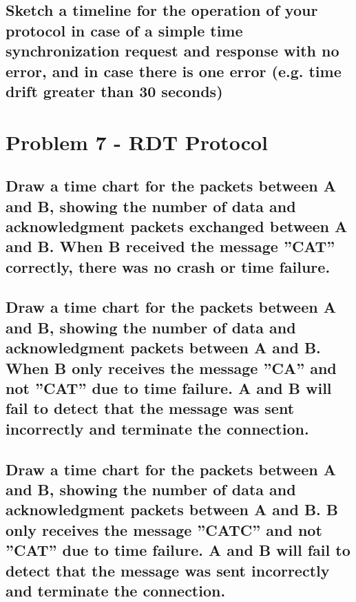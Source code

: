 \documentclass{article}
\begin{document}
\subsection{Sketch a timeline for the operation of your protocol in case of a simple time
synchronization request and response with no error, and in case there is one error (e.g.
time drift greater than 30 seconds)}

\section{Problem 7 - RDT Protocol}

\subsection{Draw a time chart for the packets between A and B, showing the number of
data and acknowledgment packets exchanged between A and B. When B received the
message ”CAT” correctly, there was no crash or time failure.}

\subsection{Draw a time chart for the packets between A and B, showing the number of
data and acknowledgment packets between A and B. When B only receives the message
”CA” and not ”CAT” due to time failure. A and B will fail to detect that the message
was sent incorrectly and terminate the connection.}

\subsection{Draw a time chart for the packets between A and B, showing the number of
data and acknowledgment packets between A and B. B only receives the message ”CATC”
and not ”CAT” due to time failure. A and B will fail to detect that the message was sent
incorrectly and terminate the connection.}
\end{document}
